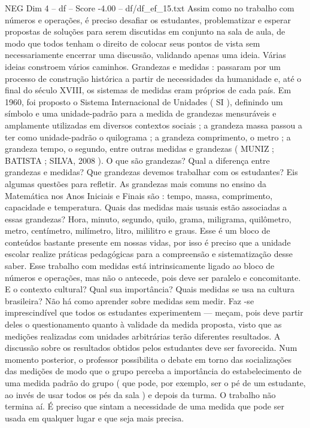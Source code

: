 \begin{textsample}{NEG Dim 4 – df – Score -4.00 – df/df\_ef\_15.txt}
Assim como no trabalho com números e operações, é preciso desafiar os estudantes, problematizar e esperar propostas de soluções para serem discutidas em conjunto na sala de aula, de modo que todos tenham o direito de colocar seus pontos de vista sem necessariamente encerrar uma discussão, validando apenas uma ideia.
Várias ideias constroem vários caminhos.
Grandezas e medidas : passaram por um processo de construção histórica a partir de necessidades da humanidade e, até o final do século XVIII, os sistemas de medidas eram próprios de cada país.
Em 1960, foi proposto o Sistema Internacional de Unidades ( SI ), definindo um símbolo e uma unidade-padrão para a medida de grandezas mensuráveis e amplamente utilizadas em diversos contextos sociais ; a grandeza massa passou a ter como unidade-padrão o quilograma ; a grandeza comprimento, o metro ; a grandeza tempo, o segundo, entre outras medidas e grandezas ( MUNIZ ; BATISTA ; SILVA, 2008 ).
O que são grandezas?
Qual a diferença entre grandezas e medidas?
Que grandezas devemos trabalhar com os estudantes?
Eis algumas questões para refletir.
As grandezas mais comuns no ensino da Matemática nos Anos Iniciais e Finais são : tempo, massa, comprimento, capacidade e temperatura.
Quais das medidas mais usuais estão associadas a essas grandezas?
Hora, minuto, segundo, quilo, grama, miligrama, quilômetro, metro, centímetro, milímetro, litro, mililitro e graus.
Esse é um bloco de conteúdos bastante presente em nossas vidas, por isso é preciso que a unidade escolar realize práticas pedagógicas para a compreensão e sistematização desse saber.
Esse trabalho com medidas está intrinsicamente ligado ao bloco de números e operações, mas não o antecede, pois deve ser paralelo e concomitante.
E o contexto cultural?
Qual sua importância?
Quais medidas se usa na cultura brasileira?
Não há como aprender sobre medidas sem medir.
Faz -se imprescindível que todos os estudantes experimentem — meçam, pois deve partir deles o questionamento quanto à validade da medida proposta, visto que as medições realizadas com unidades arbitrárias terão diferentes resultados.
A discussão sobre os resultados obtidos pelos estudantes deve ser favorecida.
Num momento posterior, o professor possibilita o debate em torno das socializações das medições de modo que o grupo perceba a importância do estabelecimento de uma medida padrão do grupo ( que pode, por exemplo, ser o pé de um estudante, ao invés de usar todos os pés da sala ) e depois da turma.
O trabalho não termina aí.
É preciso que sintam a necessidade de uma medida que pode ser usada em qualquer lugar e que seja mais precisa.

\end{textsample}
